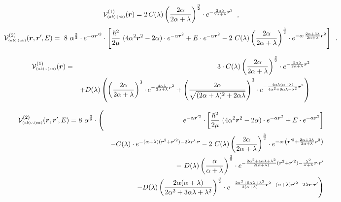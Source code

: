 \documentclass[onecolumn,preprint,superscriptaddress,nofootinbib,notitlepage,10pt,linenumbers]{revtex4-1}
\newcommand*{\mprime}{^{\prime}\mkern-1.2mu}
\newcommand{\la}{\label}
\newcommand{\be}{\begin{equation}}
\newcommand{\ee}{\end{equation}}
\newcommand{\ve}[1]{\ensuremath{\boldsymbol{#1}}}
\newcommand{\cc}{\ensuremath C(\lambda)}
\newcommand{\dd}{\ensuremath D(\lambda)}
\newcommand{\abab}{\ensuremath $(ab)\!\!:\!\!(ab)$}
\newcommand{\abca}{\ensuremath $(ab)\wasytherefore(ca)$}
\begin{document}
\begin{description}
	\item[\abab]
\be\la{eq.local.abab}
\mathcal{V}^{(1)}_{\text{\tiny\abab}}(\ve{r})=
2\,\cc\left(\frac{2\alpha}{2\alpha+\lambda}\right)^{\frac{3}{2}}\cdot
 e^{-\frac{2\alpha\lambda}{2\alpha+\lambda}\ve{r}^2}\;\;,
\ee
\be\la{eq.nonlocal.abab}
\mathcal{V}^{(2)}_{\text{\tiny\abab}}(\ve{r},\ve{r}\mprime,E)=
~8~\alpha^{\frac{3}{2}}\cdot e^{-\alpha\ve{r}\mprime^2}\cdot
\left[\frac{\hbar^2}{2\mu}~(4\alpha^2\ve{r}^2-2\alpha)
\cdot e^{-\alpha\ve{r}^2}+
E\cdot e^{-\alpha\ve{r}^2}
-2~\cc\left(\frac{2\alpha}{2\alpha+\lambda}\right)^{\frac{3}{2}}\cdot
 e^{-\alpha\cdot\frac{2\alpha+3\lambda}{2\alpha+\lambda}\ve{r}^2}\right]\;\;.
\ee

\item[\abca]
\begin{eqnarray}\la{eq.local.abca}
\mathcal{V}^{(1)}_{\text{\tiny\abca}}(\ve{r})&=&
3\cdot \cc\left(\frac{2\alpha}{2\alpha+\lambda}\right)^{\frac{3}{2}}\cdot
 e^{-\frac{2\alpha\lambda}{2\alpha+\lambda}\ve{r}^2}\\
&&+\dd\left(
\left(\frac{2\alpha}{2\alpha+\lambda}\right)^{3}\cdot e^{-\frac{4\alpha\lambda}{2\alpha+\lambda}\ve{r}^2}+
\left(\frac{2\alpha}{\sqrt{(2\alpha+\lambda)^2+2\alpha\lambda}}\right)^{3}\cdot
 e^{-\frac{4\alpha\lambda(\alpha+\lambda)}{4\alpha^2+6\alpha\lambda+\lambda^2}\ve{r}^2}
\right)
\end{eqnarray}


\begin{eqnarray}
\mathcal{V}^{(2)}_{\text{\tiny\abca}}(\ve{r},\ve{r}\mprime,E)=&~8~\alpha^{\frac{3}{2}}\cdot\Bigg(&e^{-\alpha\ve{r}\mprime^2}\cdot
\left[\frac{\hbar^2}{2\mu}~(4\alpha^2\ve{r}^2-2\alpha)
\cdot e^{-\alpha\ve{r}^2}+
E\cdot e^{-\alpha\ve{r}^2}\right]\\
&&-\cc\cdot
 e^{-(\alpha+\lambda)(\ve{r}^2+\ve{r}\mprime^2)-2\lambda\ve{r}\mprime\cdot\ve{r}}
-2~\cc\left(\frac{2\alpha}{2\alpha+\lambda}\right)^{\frac{3}{2}}\cdot
 e^{-\alpha\cdot\left(\ve{r}\mprime^2+\frac{2\alpha+3\lambda}{2\alpha+\lambda}\ve{r}^2\right)}\\
 &&-~\dd\left(\frac{\alpha}{\alpha+\lambda}\right)^{\frac{3}{2}}\cdot
 e^{-\frac{2\alpha^2+4\alpha\lambda+\lambda^2}{2(\alpha+\lambda)}(\ve{r}^2+\ve{r}\mprime^2)-\frac{\lambda^2}{\alpha+\lambda}\ve{r}\cdot\ve{r}\mprime}\\
 &&-\dd\left(\frac{2\alpha(\alpha+\lambda)}{2\alpha^2+3\alpha\lambda+\lambda^2}\right)^{\frac{3}{2}}\cdot
 e^{-\frac{2\alpha^2+5\alpha\lambda+\lambda^2}{2(\alpha+\lambda)}\ve{r}^2-(\alpha+\lambda)\ve{r}\mprime^2-2\lambda\ve{r}\cdot\ve{r}\mprime}\Bigg)
 \la{eq.nonlocal.abca}
\end{eqnarray}

\end{description}
\end{document}
